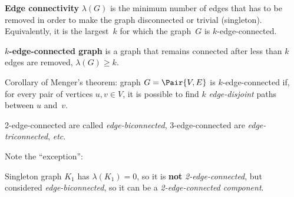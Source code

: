 \documentclass[a4paper,10pt]{article}
\newcommand{\edgeConnectivity}[1]{\lambda(#1)}
\begin{document}
\begin{terms}
\begin{terms}
\begin{terms}
        \end{terms}
    \end{terms}

    \item \textbf{Edge connectivity} $\edgeConnectivity{G}$ is the minimum number of edges that has to be removed in order to make the graph disconnected or trivial (singleton).
    Equivalently, it is the largest~$k$ for which the graph~$G$ is $k$-edge-connected.

    \item \textbf{$k$-edge-connected graph} is a graph that remains connected after less than $k$ edges are removed, \ie $\edgeConnectivity{G} \geq k$.
    \begin{terms}
        \item Corollary of Menger's theorem: graph $G = \Pair{V,E}$ is $k$-edge-connected if, for every pair of vertices $u,v \in V$, it is possible to find $k$ \emph{edge-disjoint} paths between $u$ and~$v$.

        \item 2-edge-connected are called \emph{edge-biconnected}, 3-edge-connected are \emph{edge-triconnected}, \textit{etc}.

        \item Note the \enquote{exception}:
        \begin{terms}
            \item Singleton graph $K_1$ has $\edgeConnectivity{K_1} = 0$, so it is \textbf{not} \emph{2-edge-connected}, but considered \emph{edge-biconnected}, so it can be a \emph{2-edge-connected component}.
        \end{terms}
    \end{terms}

    \begin{minipage}{\linewidth}


\end{minipage}
\end{terms}
\end{document}
